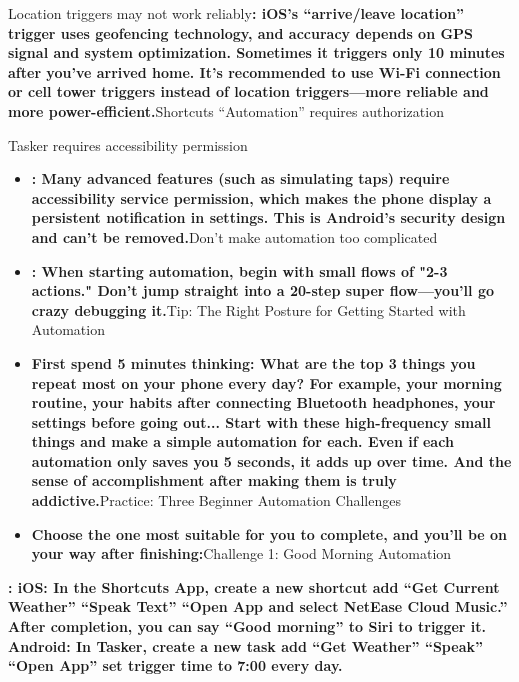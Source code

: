 Location triggers may not work reliably\textbf{: iOS's “arrive/leave location” trigger uses geofencing technology, and accuracy depends on GPS signal and system optimization. Sometimes it triggers only 10 minutes after you've arrived home. It's recommended to use Wi-Fi connection or cell tower triggers instead of location triggers—more reliable and more power-efficient.}Shortcuts “Automation” requires authorization


Tasker requires accessibility permission

\begin{itemize}
  \item \textbf{: Many advanced features (such as simulating taps) require accessibility service permission, which makes the phone display a persistent notification in settings. This is Android's security design and can't be removed.}Don't make automation too complicated
  \item \textbf{: When starting automation, begin with small flows of "2-3 actions." Don't jump straight into a 20-step super flow—you'll go crazy debugging it.}Tip: The Right Posture for Getting Started with Automation
  \item \textbf{First spend 5 minutes thinking: What are the top 3 things you repeat most on your phone every day? For example, your morning routine, your habits after connecting Bluetooth headphones, your settings before going out... Start with these high-frequency small things and make a simple automation for each. Even if each automation only saves you 5 seconds, it adds up over time. And the sense of accomplishment after making them is truly addictive.}Practice: Three Beginner Automation Challenges
  \item \textbf{Choose the one most suitable for you to complete, and you'll be on your way after finishing:}Challenge 1: Good Morning Automation
\end{itemize}

\textbf{: iOS: In the Shortcuts App, create a new shortcut add “Get Current Weather” “Speak Text” “Open App and select NetEase Cloud Music.” After completion, you can say “Good morning” to Siri to trigger it. Android: In Tasker, create a new task add “Get Weather” “Speak” “Open App” set trigger time to 7:00 every day.}\par

